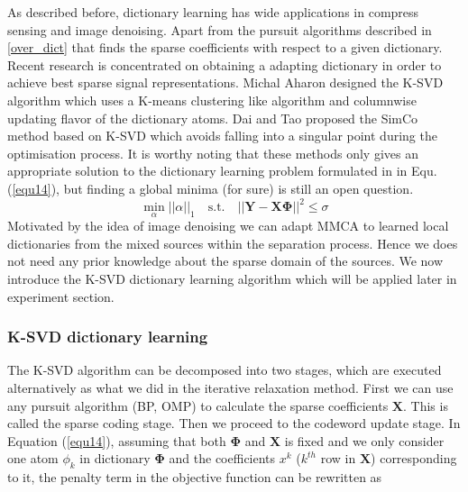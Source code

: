 As described before, dictionary learning has wide applications in compress sensing and image denoising. Apart from the pursuit algorithms described in \ref{over_dict} that finds the sparse coefficients with respect to a given dictionary. Recent research is concentrated on obtaining a adapting dictionary in order to achieve best sparse signal representations. Michal Aharon designed the K-SVD \cite{AharonM2006KAaf} algorithm which uses a K-means clustering like algorithm and columnwise updating flavor of the dictionary atoms. Dai and Tao proposed the SimCo method \cite{6340354} based on K-SVD which avoids falling into a singular point during the optimisation process. It is worthy noting that these methods only gives an appropriate solution to the dictionary learning problem formulated in in Equ.(\ref{equ14}), but finding a global minima (for sure) is still an open question.\\
\begin{equation}
    \min_{\alpha}||\alpha||_1 \quad \text{s.t.} \quad || \mathbf{Y} - \mathbf{X} \mathbf{\Phi}||^2 \leq \sigma
    \label{equ14}
\end{equation}
Motivated by the idea of image denoising we can adapt MMCA to learned local dictionaries from the mixed sources within the separation process\cite{VAbolghasemi2012}. Hence we does not need any prior knowledge about the sparse domain of the sources. We now introduce the K-SVD dictionary learning algorithm which will be applied later in experiment section.\\

\subsubsection{K-SVD dictionary learning}
The K-SVD algorithm can be decomposed into two stages, which are executed alternatively as what we did in the iterative relaxation method. First we can use any pursuit algorithm (BP, OMP) to calculate the sparse coefficients $\mathbf{X}$. This is called the sparse coding stage. Then we proceed to the codeword update stage. In Equation (\ref{equ14}), assuming that both $\mathbf{\Phi}$ and $\mathbf{X}$ is fixed and we only consider one atom $\phi_k$ in dictionary $\mathbf{\Phi}$ and the coefficients $x^k$ ($k^{th}$ row in $\mathbf{X}$) corresponding to it, the penalty term in the objective function can be rewritten as

